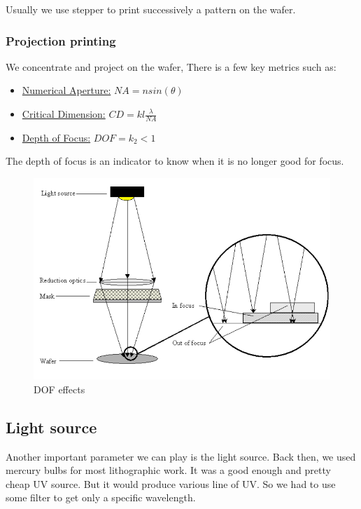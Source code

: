 \documentclass{report}
\begin{document}
Usually we use stepper to print successively a pattern on the wafer.

\subsubsection{Projection printing}

We concentrate and project on the wafer, There is a few key metrics such as:

\begin{itemize}
    \item \underline{Numerical Aperture:} $NA = n sin(\theta)$
    \item \underline{Critical Dimension:} $CD = kl \frac{\lambda}{NA}$
    \item \underline{Depth of Focus:} $DOF = k_2 < 1$
\end{itemize}

The depth of focus is an indicator to know when it is no longer good for focus.

\begin{figure}[H]
    \centering
    \includegraphics[width=0.5\linewidth]{DOF_effects.png}
    \caption{DOF effects}
    \label{fig:enter-label}
\end{figure}

\subsection{Light source}

Another important parameter we can play is the light source. Back then, we used mercury bulbs for most lithographic work. It was a good enough and pretty cheap UV source. But it would produce various line of UV. So we had to use some filter to get only a specific wavelength.
\end{document}
